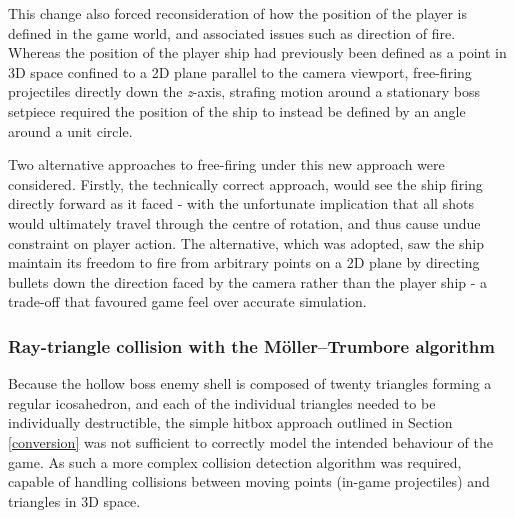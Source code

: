 \documentclass[11pt]{article}
\begin{document}

This change also forced reconsideration of how the position of the player is defined
in the game world, and associated issues such as direction of fire. Whereas the position
of the player ship had previously been defined as a point in 3D space confined to a 2D
plane parallel to the camera viewport, free-firing projectiles directly down the \textit{z}-axis,
strafing motion around a stationary boss setpiece required the position of the ship to instead
be defined by an angle around a unit circle.

Two alternative approaches to free-firing under this new approach were considered. Firstly,
the technically correct approach, would see the ship firing directly forward as it faced - with
the unfortunate implication that all shots would ultimately travel through the centre of
rotation, and thus cause undue constraint on player action. The alternative, which was adopted,
saw the ship maintain its freedom to fire from arbitrary points on a 2D plane by directing
bullets down the direction faced by the camera rather than the player ship - a trade-off
that favoured game feel over accurate simulation.


\subsubsection*{Ray-triangle collision with the Möller–Trumbore algorithm}


Because the hollow boss enemy shell is composed of twenty triangles forming a regular icosahedron,
and each of the individual triangles needed to be individually destructible, the simple hitbox
approach outlined in Section \ref{conversion} was not sufficient to correctly model the intended
behaviour of the game. As such a more complex collision detection algorithm was required, capable
of handling collisions between moving points (in-game projectiles) and triangles in 3D space.
\end{document}
